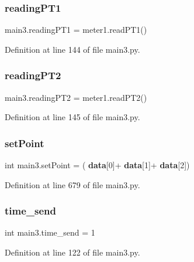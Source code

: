 \subsubsection{reading\+P\+T1}
{\footnotesize\ttfamily main3.\+reading\+P\+T1 = meter1.\+read\+P\+T1()}



Definition at line 144 of file main3.\+py.

\mbox{\label{namespacemain3_a77f2179ee84347784f243bf150c0e373}} 
\subsubsection{reading\+P\+T2}
{\footnotesize\ttfamily main3.\+reading\+P\+T2 = meter1.\+read\+P\+T2()}



Definition at line 145 of file main3.\+py.

\mbox{\label{namespacemain3_a248f67a00d1a70af3906de327bd341e2}} 
\subsubsection{set\+Point}
{\footnotesize\ttfamily int main3.\+set\+Point = (\textbf{ data}[0]+\textbf{ data}[1]+\textbf{ data}[2])}



Definition at line 679 of file main3.\+py.

\mbox{\label{namespacemain3_aefc1f762f0a9b87f47694cb1310cd460}} 
\subsubsection{time\+\_\+send}
{\footnotesize\ttfamily int main3.\+time\+\_\+send = 1}



Definition at line 122 of file main3.\+py.

